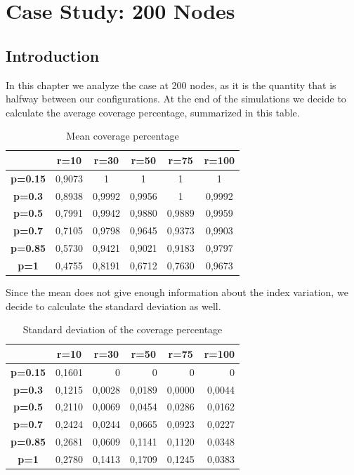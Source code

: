 \section{Case Study: 200 Nodes}
\subsection{Introduction}\label{subsec:case-study-200}
In this chapter we analyze the case at 200 nodes, as it is the quantity that is halfway between our configurations. At the end of the simulations we decide to calculate the average coverage percentage, summarized in this table.



\begin{table}[H]
\centering
\begin{tabular}{|c|c|c|c|c|c|}
\hline
 & \textbf{r=10} & \textbf{r=30} & \textbf{r=50} & \textbf{r=75} & \textbf{r=100} \\ \hline
\textbf{p=0.15} & 0,9073 & 1 & 1 & 1 & 1 \\ \hline
\textbf{p=0.3} & 0,8938 & 0,9992 & 0,9956 & 1 & 0,9992 \\ \hline
\textbf{p=0.5} & 0,7991 & 0,9942 & 0,9880 & 0,9889 & 0,9959 \\ \hline
\textbf{p=0.7} & 0,7105 & 0,9798 & 0,9645 & 0,9373 & 0,9903 \\ \hline
\textbf{p=0.85} & 0,5730 & 0,9421 & 0,9021 & 0,9183 & 0,9797 \\ \hline
\textbf{p=1} & 0,4755 & 0,8191 & 0,6712 & 0,7630 & 0,9673 \\ \hline
\end{tabular}
\caption{Mean coverage percentage}
\label{tab:mean-coverage-percentage}
\end{table}


Since the mean does not give enough information about the index variation, we decide to calculate the standard deviation as well.


\begin{table}[H]
\centering
\begin{tabular}{|c|r|r|r|r|r|}
\hline
 & \multicolumn{1}{c|}{\textbf{r=10}} & \multicolumn{1}{c|}{\textbf{r=30}} & \multicolumn{1}{c|}{\textbf{r=50}} & \multicolumn{1}{c|}{\textbf{r=75}} & \multicolumn{1}{c|}{\textbf{r=100}} \\ \hline
\textbf{p=0.15} & 0,1601 & 0 & 0 & 0 & 0 \\ \hline
\textbf{p=0.3} & 0,1215 & 0,0028 & 0,0189 & 0,0000 & 0,0044 \\ \hline
\textbf{p=0.5} & 0,2110 & 0,0069 & 0,0454 & 0,0286 & 0,0162 \\ \hline
\textbf{p=0.7} & 0,2424 & 0,0244 & 0,0665 & 0,0923 & 0,0227 \\ \hline
\textbf{p=0.85} & 0,2681 & 0,0609 & 0,1141 & 0,1120 & 0,0348 \\ \hline
\textbf{p=1} & 0,2780 & 0,1413 & 0,1709 & 0,1245 & 0,0383 \\ \hline
\end{tabular}
\caption{Standard deviation of the coverage percentage}
\label{tab:std-coverage-percentage}
\end{table}

